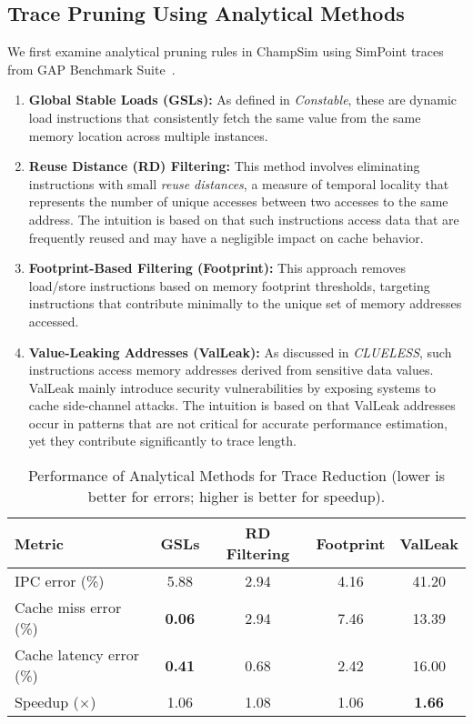 \subsection*{Trace Pruning Using Analytical Methods}
We first examine analytical pruning rules in ChampSim using SimPoint traces from GAP Benchmark Suite~\cite{beamer2017gapbenchmarksuite}.
\begin{enumerate}[nosep, leftmargin=*]
    \item \textbf{Global Stable Loads (GSLs):} As defined in \textit{Constable}\cite{constable}, these are dynamic load instructions that consistently fetch the same value from the same memory location across multiple instances.  
    \item \textbf{Reuse Distance (RD) Filtering:} This method involves eliminating instructions with small \emph{reuse distances}, a measure of temporal locality that represents the number of unique accesses between two accesses to the same address. The intuition is based on that such instructions access  data that are frequently reused and may have a negligible impact on cache behavior.
    \item \textbf{Footprint-Based Filtering (Footprint):} This approach removes load/store instructions based on memory footprint thresholds, targeting instructions that contribute minimally to the unique set of memory addresses accessed.
    \item \textbf{Value-Leaking Addresses (ValLeak):} As discussed in \emph{CLUELESS}\cite{clueless}, such instructions access memory addresses derived from sensitive data values. ValLeak mainly introduce security vulnerabilities by exposing systems to cache side-channel attacks. { The intuition is based on that ValLeak addresses occur in patterns that are not critical for accurate performance estimation, yet they contribute significantly to trace length.}
\end{enumerate} 


\begin{table}[htbp!]
\caption{Performance of Analytical Methods for Trace Reduction (lower is better for errors; higher is better for speedup).}
\label{tab:comparison_methods}
\centering
\setlength{\tabcolsep}{4pt}
\begin{adjustbox}{max width=1.09\columnwidth}
\begin{tabular}{l|cccc}
\toprule
Metric & GSLs & RD Filtering & Footprint & ValLeak \\
\midrule
IPC error (\%)             & 5.88 & {2.94} & 4.16 & 41.20 \\
Cache miss error (\%)      & \textbf{0.06} & 2.94 & 7.46 & 13.39 \\
Cache latency error (\%)   & \textbf{0.41} & 0.68 & 2.42 & 16.00 \\
Speedup ($\times$)         & 1.06 & 1.08 & 1.06 & \textbf{1.66} \\
\bottomrule
\end{tabular}
\end{adjustbox}
\end{table}


